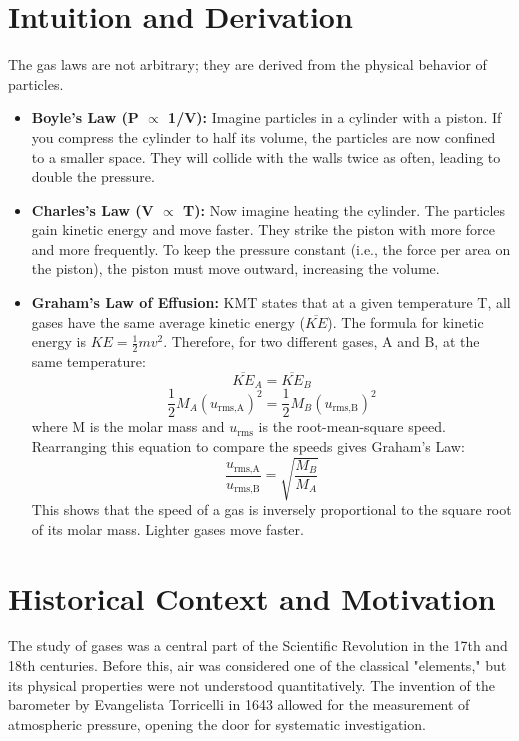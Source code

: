 \documentclass{article}
\begin{document}
\section{Intuition and Derivation}
The gas laws are not arbitrary; they are derived from the physical behavior of particles.
\begin{itemize}
    \item \textbf{Boyle's Law (P $\propto$ 1/V):} Imagine particles in a cylinder with a piston. If you compress the cylinder to half its volume, the particles are now confined to a smaller space. They will collide with the walls twice as often, leading to double the pressure.
    \item \textbf{Charles's Law (V $\propto$ T):} Now imagine heating the cylinder. The particles gain kinetic energy and move faster. They strike the piston with more force and more frequently. To keep the pressure constant (i.e., the force per area on the piston), the piston must move outward, increasing the volume.
    \item \textbf{Graham's Law of Effusion:} KMT states that at a given temperature T, all gases have the same average kinetic energy ($\overline{KE}$). The formula for kinetic energy is $KE = \frac{1}{2}mv^2$. Therefore, for two different gases, A and B, at the same temperature:
    \[ \overline{KE}_A = \overline{KE}_B \]
    \[ \frac{1}{2} M_A (u_{\text{rms,A}})^2 = \frac{1}{2} M_B (u_{\text{rms,B}})^2 \]
    where M is the molar mass and $u_{\text{rms}}$ is the root-mean-square speed. Rearranging this equation to compare the speeds gives Graham's Law:
    \[ \frac{u_{\text{rms,A}}}{u_{\text{rms,B}}} = \sqrt{\frac{M_B}{M_A}} \]
    This shows that the speed of a gas is inversely proportional to the square root of its molar mass. Lighter gases move faster.
\end{itemize}

\section{Historical Context and Motivation}
The study of gases was a central part of the Scientific Revolution in the 17th and 18th centuries. Before this, air was considered one of the classical "elements," but its physical properties were not understood quantitatively. The invention of the barometer by Evangelista Torricelli in 1643 allowed for the measurement of atmospheric pressure, opening the door for systematic investigation.
\end{document}
